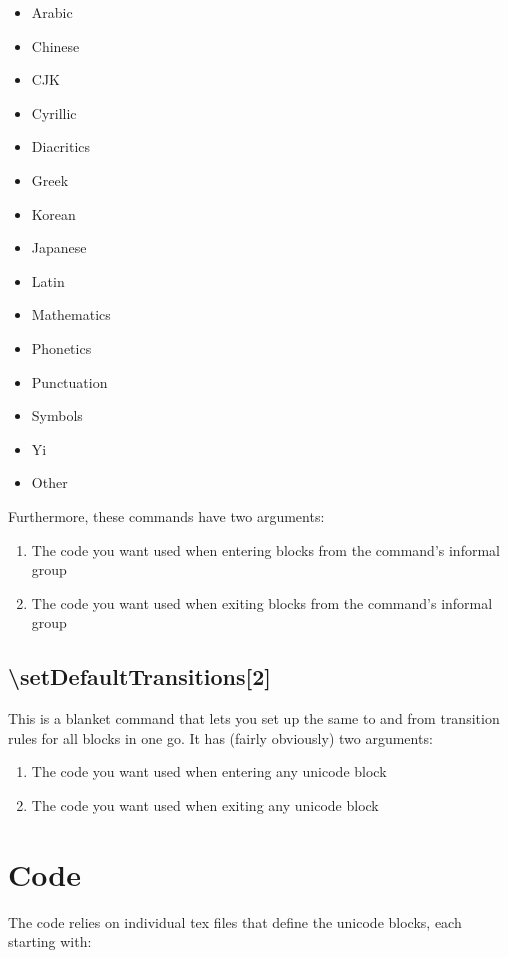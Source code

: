 \documentclass{article}
\newenvironment{itemlist}{%
  \begin{itemize}
	\setlength{\itemsep}{0pt}
	\setlength{\parsep}{0pt}
	\setlength{\topsep}{0pt}
	\setlength{\partopsep}{0pt}
	\setlength{\parskip}{0pt}
	\setlength{\labelsep}{5pt}}%
{
  \end{itemize}}
\newenvironment{numberlist}{%
  \begin{enumerate}
	\setlength{\itemsep}{0pt}
	\setlength{\parsep}{0pt}
	\setlength{\topsep}{0pt}
	\setlength{\partopsep}{0pt}
	\setlength{\parskip}{0pt}
	\setlength{\labelsep}{5pt}}%
{
  \end{enumerate}}
\begin{document}
			\begin{itemlist}
				\item Arabic
				\item Chinese
				\item CJK
				\item Cyrillic
				\item Diacritics
				\item Greek
				\item Korean
				\item Japanese
				\item Latin
				\item Mathematics
				\item Phonetics
				\item Punctuation
				\item Symbols
				\item Yi
				\item Other
			\end{itemlist}
			
			Furthermore, these commands have two arguments:
			
			\begin{numberlist}
				\item The code you want used when entering blocks from the command's informal group
				\item The code you want used when exiting blocks from the command's informal group
			\end{numberlist}
		
		\subsection{\textbackslash setDefaultTransitions[2]}
		
			This is a blanket command that lets you set up the same to and from transition rules for all blocks in one go. It has (fairly obviously) two arguments:
			
			\begin{numberlist}
				\item The code you want used when entering any unicode block
				\item The code you want used when exiting any unicode block
			\end{numberlist}

	\section{Code}
	
		The code relies on individual tex files that define the unicode blocks, each starting with:
		
\end{document}
